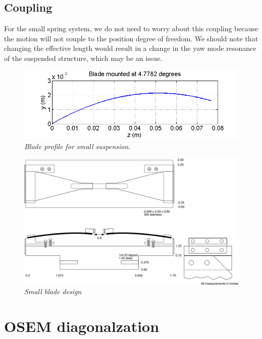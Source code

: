 \subsection{Coupling}
For the small spring system, we do not need to worry about this coupling because the motion will not couple to the position degree of freedom.  We should note that changing the effective length would result in a change in the yaw mode resonance of the suspended structure, which may be an issue. 



\begin{figure}[hp]
	\centering
		\includegraphics[width=.9\textwidth]{figures/suspensions/babybladeprofile.png}
	\caption{\emph{Blade profile for small suspension.}}
	\label{fig:babybladeprofile}
\end{figure}





\begin{figure}[p]
	\centering
		\includegraphics[width=\textwidth, angle=90]{figures/suspensions/bb1.png}
	\caption{\emph{Small blade design}}
	\label{fig:babyschematic}
\end{figure}
\section{OSEM diagonalzation}

